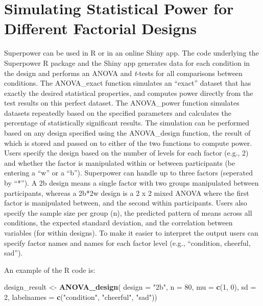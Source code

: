 \documentclass[
  ,jou,floatsintext]{apa6}
\newenvironment{Shaded}{\begin{snugshade}}{\end{snugshade}}
\newcommand{\DataTypeTok}[1]{\textcolor[rgb]{0.13,0.29,0.53}{#1}}
\newcommand{\DecValTok}[1]{\textcolor[rgb]{0.00,0.00,0.81}{#1}}
\newcommand{\KeywordTok}[1]{\textcolor[rgb]{0.13,0.29,0.53}{\textbf{#1}}}
\newcommand{\NormalTok}[1]{#1}
\newcommand{\StringTok}[1]{\textcolor[rgb]{0.31,0.60,0.02}{#1}}
\begin{document}
\hypertarget{simulating-statistical-power-for-different-factorial-designs}{%
\section{Simulating Statistical Power for Different Factorial Designs}\label{simulating-statistical-power-for-different-factorial-designs}}

Superpower can be used in R or in an online Shiny app.
The code underlying the Superpower R package and the Shiny app generates data for each condition in the design and performs an ANOVA and \emph{t}-tests for all comparisons between conditions.
The ANOVA\_exact function simulates an \enquote{exact} dataset that has exactly the desired statistical properties, and computes power directly from the test results on this perfect dataset.
The ANOVA\_power function simulates datasets repeatedly based on the specified parameters and calculates the percentage of statistically significant results.
The simulation can be performed based on any design specified using the ANOVA\_design function, the result of which is stored and passed on to either of the two functions to compute power.
Users specify the design based on the number of levels for each factor (e.g., 2) and whether the factor is manipulated within or between participants (be entering a \enquote{w} or a \enquote{b}).
Superpower can handle up to three factors (seperated by \enquote{*}).
A 2b design means a single factor with two groups manipulated between participants, whereas a 2b*2w design is a 2 x 2 mixed ANOVA where the first factor is manipulated between, and the second within participants.
Users also specify the sample size per group (n), the predicted pattern of means across all conditions, the expected standard deviation, and the correlation between variables (for within designs).
To make it easier to interpret the output users can specify factor names and names for each factor level (e.g., \enquote{condition, cheerful, sad}).

An example of the R code is:

\begin{Shaded}
\begin{Highlighting}[]
\NormalTok{design_result <-}\StringTok{ }\KeywordTok{ANOVA_design}\NormalTok{(}
  \DataTypeTok{design =} \StringTok{"2b"}\NormalTok{, }\DataTypeTok{n =} \DecValTok{80}\NormalTok{, }\DataTypeTok{mu =} \KeywordTok{c}\NormalTok{(}\DecValTok{1}\NormalTok{, }\DecValTok{0}\NormalTok{), }\DataTypeTok{sd =} \DecValTok{2}\NormalTok{,}
  \DataTypeTok{labelnames =} \KeywordTok{c}\NormalTok{(}\StringTok{"condition"}\NormalTok{, }
                 \StringTok{"cheerful"}\NormalTok{, }\StringTok{"sad"}\NormalTok{))}
\end{Highlighting}
\end{Shaded}
\end{document}
